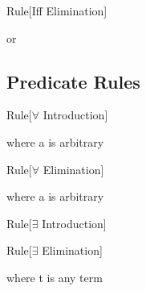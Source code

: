 \begin{namedthm}{Rule}[Iff Elimination]

\begin{bprooftree}
\end{bprooftree}\qquad or \qquad
\begin{bprooftree}
\end{bprooftree}

\end{namedthm}


\subsection{Predicate Rules}
\label{appendix:nd-pred}

\begin{namedthm}{Rule}[$\forall$ Introduction]

\begin{bprooftree}
\end{bprooftree}\qquad where a is arbitrary \qquad

\end{namedthm}

\begin{namedthm}{Rule}[$\forall$ Elimination]

\begin{bprooftree}
\end{bprooftree}\qquad where a is arbitrary \qquad

\end{namedthm}


\begin{namedthm}{Rule}[$\exists$ Introduction]

\begin{bprooftree}
\end{bprooftree}\qquad

\end{namedthm}

\begin{namedthm}{Rule}[$\exists$ Elimination]

\begin{bprooftree}
\end{bprooftree}\qquad where t is any term

\end{namedthm}

